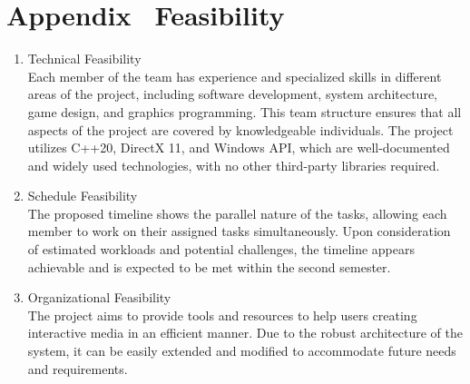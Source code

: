 \section*{Appendix \thesection \, \textbar \vspace{0.5em} Feasibility}
\label{sec:appendix-feasibility}
%

\begin{enumerate}
    \item Technical Feasibility\\
    Each member of the team has experience and specialized skills in different areas of the project, 
    including software development, system architecture, game design, and graphics programming.
    This team structure ensures that all aspects of the project are covered by knowledgeable individuals.
    The project utilizes C++20, DirectX 11, and Windows API, which are well-documented and widely used technologies, with no other third-party libraries required.

    \item Schedule Feasibility\\
    The proposed timeline shows the parallel nature of the tasks, allowing each member to work on their assigned tasks simultaneously.
    Upon consideration of estimated workloads and potential challenges, the timeline appears achievable and is expected to be met within the second semester.

    \item Organizational Feasibility\\
    The project aims to provide tools and resources to help users creating interactive media in an efficient manner.
    Due to the robust architecture of the system, it can be easily extended and modified to accommodate future needs and requirements.

\end{enumerate}